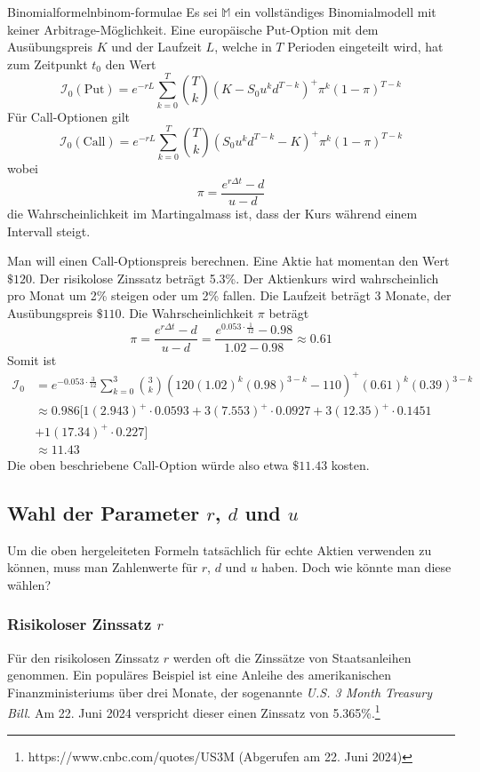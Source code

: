 \documentclass[11pt]{report} %
\begin{document}
\begin{Theorem}{Binomialformeln}{binom-formulae}
    Es sei $\mathbb{M}$ ein vollständiges Binomialmodell mit keiner Arbitrage-Möglichkeit. Eine europäische Put-Option mit dem Ausübungspreis $K$ und der Laufzeit $L$, welche in $T$ Perioden eingeteilt wird, hat zum Zeitpunkt $t_0$ den Wert $$\mathcal{I}_0(\text{Put})=e^{-rL}\sum_{k=0}^{T}\binom{T}{k}(K-S_0u^{k}d^{T-k})^+\pi^k(1-\pi)^{T-k}$$
    Für Call-Optionen gilt $$\mathcal{I}_0(\text{Call})=e^{-rL}\sum_{k=0}^{T}\binom{T}{k}(S_0u^{k}d^{T-k}-K)^+\pi^k(1-\pi)^{T-k}$$ wobei $$\pi=\frac{e^{r\Delta t}-d}{u-d}$$ die Wahrscheinlichkeit im Martingalmass ist, dass der Kurs während einem Intervall steigt.
\end{Theorem}
\begin{Beispiel}{}{}
    Man will einen Call-Optionspreis berechnen. Eine Aktie hat momentan den Wert $\$120$. Der risikolose Zinssatz beträgt 5.3\%. Der Aktienkurs wird wahrscheinlich pro Monat um 2\% steigen oder um 2\% fallen. Die Laufzeit beträgt 3 Monate, der Ausübungspreis $\$110$. Die Wahrscheinlichkeit $\pi$ beträgt 
    $$\pi=\frac{e^{r\Delta t}-d}{u-d}=\frac{e^{0.053\cdot\frac{1}{12}}-0.98}{1.02-0.98}\approx0.61$$
    Somit ist 
    \begin{align*}
        \mathcal{I}_0&=e^{-0.053\cdot\frac{3}{12}}\sum_{k=0}^{3}\binom{3}{k}(120(1.02)^k(0.98)^{3-k}-110)^+(0.61)^k(0.39)^{3-k}\\
        &\approx0.986[1(2.943)^+\cdot0.0593+3(7.553)^+\cdot0.0927 +3(12.35)^+\cdot0.1451\\&+1(17.34)^+\cdot0.227]\\
        &\approx11.43
    \end{align*}
    Die oben beschriebene Call-Option würde also etwa $\$11.43$ kosten.
\end{Beispiel}
\subsection{Wahl der Parameter $r$, $d$ und $u$}
Um die oben hergeleiteten Formeln tatsächlich für echte Aktien verwenden zu können, muss man Zahlenwerte für $r$, $d$ und $u$ haben. Doch wie könnte man diese wählen?
\subsubsection{Risikoloser Zinssatz $r$}
Für den risikolosen Zinssatz $r$ werden oft die Zinssätze von Staatsanleihen genommen. Ein populäres Beispiel ist eine Anleihe des amerikanischen Finanzministeriums über drei Monate, der sogenannte \textit{U.S. 3 Month Treasury Bill}. Am 22. Juni 2024 verspricht dieser einen Zinssatz von 5.365\%.\footnote{https://www.cnbc.com/quotes/US3M (Abgerufen am 22. Juni 2024)}
\end{document}
